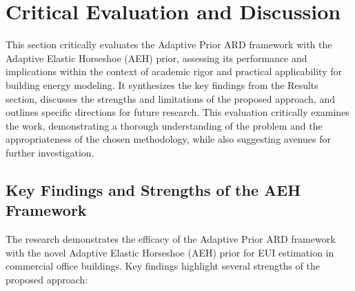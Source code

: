 \section{Critical Evaluation and Discussion}

This section critically evaluates the Adaptive Prior ARD framework with the Adaptive Elastic Horseshoe (AEH) prior, assessing its performance and implications within the context of academic rigor and practical applicability for building energy modeling. It synthesizes the key findings from the Results section, discusses the strengths and limitations of the proposed approach, and outlines specific directions for future research. This evaluation critically examines the work, demonstrating a thorough understanding of the problem and the appropriateness of the chosen methodology, while also suggesting avenues for further investigation.

\subsection{Key Findings and Strengths of the AEH Framework}

The research demonstrates the efficacy of the Adaptive Prior ARD framework with the novel Adaptive Elastic Horseshoe (AEH) prior for EUI estimation in commercial office buildings. Key findings highlight several strengths of the proposed approach:


